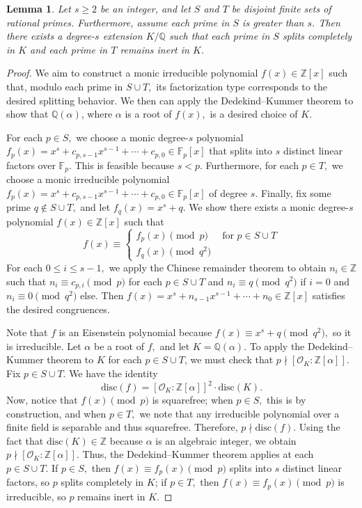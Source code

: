 \documentclass[12pt]{amsart}
\newtheorem{lemma}[theorem]{Lemma}
\theoremstyle{definition}
\numberwithin{equation}{section}
\newcommand{\Q}{\mathbb{Q}}
\newcommand{\Z}{\mathbb{Z}}
\begin{document}
\begin{lemma} \label{ntlemma}
    Let $s \geq 2$ be an integer, and let $S$ and $T$ be disjoint finite sets of rational primes. Furthermore, assume each prime in $S$ is greater than $s$. Then there exists a degree-$s$ extension $K/\Q$ such that each prime in $S$ splits completely in $K$ and each prime in $T$ remains inert in $K$. 
\end{lemma}
\begin{proof}
    We aim to construct a monic irreducible polynomial  $f(x) \in \Z[x]$ such that, modulo each prime in $S \cup T,$ its factorization type corresponds to the desired splitting behavior. We then can apply the Dedekind--Kummer theorem to show that $\Q(\alpha)$, where $\alpha$ is a root of $f(x),$ is a desired choice of $K$. 


    For each $p \in S,$ we choose a monic degree-$s$ polynomial $f_p(x) = x^s + c_{p,s-1}x^{s-1} + \cdots + c_{p,0} \in \mathbb F_p[x]$ that splits into $s$ distinct linear factors over $\mathbb F_p.$ This is feasible because $s < p.$ Furthermore, for each $p \in T,$ we choose a monic irreducible polynomial $f_p(x)  = x^s + c_{p,s-1} x^{s-1} + \cdots + c_{p,0} \in \mathbb F_p[x]$ of degree $s$. Finally, fix some prime $q \not\in S \cup T,$ and let $f_q(x) = x^s + q.$ We show there exists a monic degree-$s$ polynomial $f(x) \in \Z[x]$ such that 
    $$f(x) \equiv \begin{cases}
        f_p(x) \pmod{p}& \text{ for } p \in S \cup T \\
        f_q(x) \pmod{q^2}
    \end{cases}$$
    For each $0 \leq i \leq s-1,$ we apply the Chinese remainder theorem to obtain $n_i \in \Z$ such that $n_i \equiv c_{p,i} \pmod{p}$ for each $p \in S \cup T$ and $n_i \equiv q \pmod{q^2}$ if $i = 0$ and $n_i \equiv 0 \pmod{q^2}$ else. Then $f(x) = x^s + n_{s-1}x^{s-1} + \cdots + n_0 \in \Z[x]$ satisfies the desired congruences.  
    
    Note that $f$ is an Eisenstein polynomial because $f(x) \equiv x^s + q \pmod{q^2},$ so it is irreducible. Let $\alpha$ be a root of $f,$ and let $K  = \Q(\alpha).$ To apply the Dedekind--Kummer theorem to $K$ for each $p \in S \cup T$, we must check that $p \nmid [\mathcal O_K : \Z[\alpha]].$ Fix $p \in S \cup T$. We have the identity $$\text{disc}(f) = [\mathcal O_K : \Z[\alpha]]^2 \cdot \text{disc}(K).$$ Now, notice that $f(x) \pmod{p}$ is squarefree; when $p \in S,$ this is by construction, and when $p \in T,$ we note that any irreducible polynomial over a finite field is separable and thus squarefree. Therefore, $p \nmid \text{disc}(f)$. Using the fact that $\text{disc}(K) \in \Z$ because $\alpha$ is an algebraic integer, we obtain $p \nmid [\mathcal O_K : \Z[\alpha]].$ Thus, the Dedekind--Kummer theorem applies at each $p \in S \cup T.$ If $p \in S,$ then $f(x) \equiv f_p(x) \pmod{p}$ splits into $s$ distinct linear factors, so $p$ splits completely in $K$; if $p \in T,$ then $f(x) \equiv f_p(x) \pmod{p}$ is irreducible, so $p$ remains inert in $K$. 
\end{proof}
\end{document}
